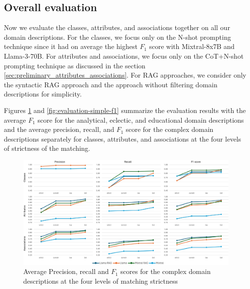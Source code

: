 \subsection{Overall evaluation}
\label{sec:overall_evaluation}

Now we evaluate the classes, attributes, and associations together on all our domain descriptions. For the classes, we focus only on the N-shot prompting technique since it had on average the highest $F_1$ score with Mixtral-8x7B and Llama-3-70B. For attributes and associations, we focus only on the CoT+N-shot prompting technique as discussed in the section \ref{sec:preliminary_attributes_associations}. For RAG approaches, we consider only the syntactic RAG approach and the approach without filtering domain descriptions for simplicity.

Figures \ref{fig:evaluation-complex-p-r-f1} and \ref{fig:evaluation-simple-f1} summarize the evaluation results with the average $F_1$ score for the analytical, eclectic, and educational domain descriptions and the average precision, recall, and $F_1$ score for the complex domain descriptions separately for classes, attributes, and associations at the four levels of strictness of the matching.

\begin{figure}[!h]
    \centering
    \includegraphics[scale=0.10]{img/evaluation-complex-p-r-f1.png}
    \caption{\centering Average Precision, recall and $F_1$ scores for the complex domain descriptions at the four levels of matching strictness}
    \label{fig:evaluation-complex-p-r-f1}
\end{figure}


